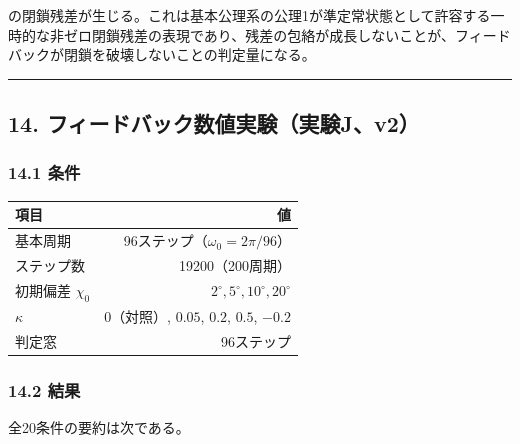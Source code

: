 \documentclass[
  a4paper,
]{ltjsarticle}
\newcounter{none} %
\begin{document}
の閉鎖残差が生じる。これは基本公理系の公理1が準定常状態として許容する一時的な非ゼロ閉鎖残差の表現であり、残差の包絡が成長しないことが、フィードバックが閉鎖を破壊しないことの判定量になる。

\begin{center}\rule{0.5\linewidth}{0.5pt}\end{center}

\subsection{14.
フィードバック数値実験（実験J、v2）}\label{ux30d5ux30a3ux30fcux30c9ux30d0ux30c3ux30afux6570ux5024ux5b9fux9a13ux5b9fux9a13jv2}

\subsubsection{14.1 条件}\label{ux6761ux4ef6}

{\def\LTcaptype{none} %
\begin{longtable}[]{@{}lr@{}}
\toprule\noalign{}
項目 & 値 \\
\midrule\noalign{}
\endhead
\bottomrule\noalign{}
\endlastfoot
基本周期 & 96ステップ（\(\omega_0=2\pi/96\)） \\
ステップ数 & 19200（200周期） \\
初期偏差 \(\chi_0\) & \(2^\circ,5^\circ,10^\circ,20^\circ\) \\
\(\kappa\) & \(0\)（対照）, \(0.05\), \(0.2\), \(0.5\), \(-0.2\) \\
判定窓 & 96ステップ \\
\end{longtable}
}

\subsubsection{14.2 結果}\label{ux7d50ux679c}

全20条件の要約は次である。
\end{document}
